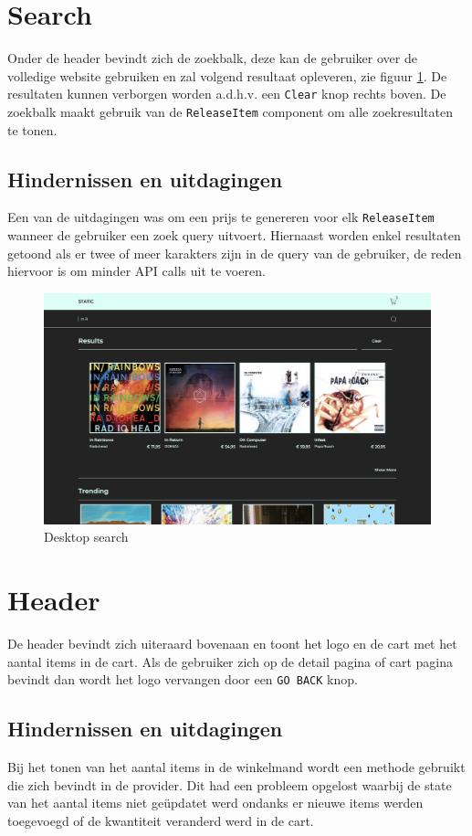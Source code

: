 \section{Search}

Onder de header bevindt zich de zoekbalk, deze kan de gebruiker over de volledige website gebruiken en zal volgend resultaat opleveren, zie figuur \ref{fig:desktopSearch}. De resultaten kunnen verborgen worden a.d.h.v. een \texttt{Clear} knop rechts boven. De zoekbalk maakt gebruik van de \texttt{ReleaseItem} component om alle zoekresultaten te tonen.

\subsection{Hindernissen en uitdagingen}

Een van de uitdagingen was om een prijs te genereren voor elk \texttt{ReleaseItem} wanneer de gebruiker een zoek query uitvoert. Hiernaast worden enkel resultaten getoond als er twee of meer karakters zijn in de query van de gebruiker, de reden hiervoor is om minder API calls uit te voeren.

\begin{figure}
	\centering
	\includegraphics[width=1\linewidth]{graphics/desktopSearch}
	\caption[Desktop search]{Desktop search}
	\label{fig:desktopSearch}
\end{figure}

\section{Header}

De header bevindt zich uiteraard bovenaan en toont het logo en de cart met het aantal items in de cart. Als de gebruiker zich op de detail pagina of cart pagina bevindt dan wordt het logo vervangen door een \texttt{GO BACK} knop.

\subsection{Hindernissen en uitdagingen}

Bij het tonen van het aantal items in de winkelmand wordt een methode gebruikt die zich bevindt in de provider. Dit had een probleem opgelost waarbij de state van het aantal items niet geüpdatet werd ondanks er nieuwe items werden toegevoegd of de kwantiteit veranderd werd in de cart.